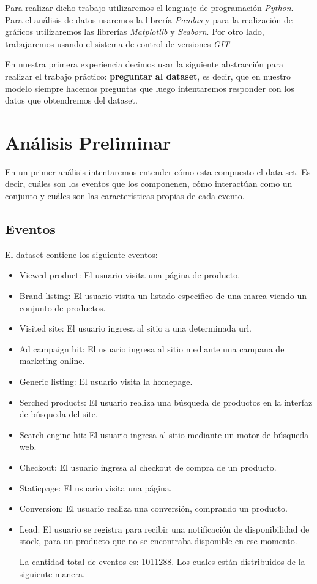 \documentclass[titlepage,a4paper]{article}
\begin{document}
	Para realizar dicho trabajo utilizaremos el lenguaje de programación \textit{Python}. Para el análisis de datos usaremos la librería \textit{Pandas} y para la realización de gráficos utilizaremos las librerías \textit{Matplotlib }y \textit{Seaborn}. Por otro lado, trabajaremos usando el sistema de control de versiones \textit{GIT}	
	
	En nuestra primera experiencia decimos usar la siguiente abstracción para realizar el trabajo práctico: \textbf{preguntar al dataset}, es decir, que en nuestro modelo siempre hacemos preguntas que luego intentaremos responder con los datos que obtendremos del dataset. 
	
	\section{Análisis Preliminar}
	En un primer análisis intentaremos entender cómo esta compuesto el data set. Es decir, cuáles son los eventos que los componenen, cómo interactúan como un conjunto y cuáles son las características propias de cada evento. 
	\subsection{Eventos}
	El dataset contiene los siguiente eventos: 
	\begin{itemize}
	\item Viewed product: El usuario visita una página de producto.
	\item Brand listing: El usuario visita un listado específico de una marca viendo un conjunto de productos.
	\item Visited site: El usuario ingresa al sitio a una determinada url.
	\item Ad campaign hit:  El usuario ingresa al sitio mediante una campana de marketing online.
	\item Generic listing:  El usuario visita la homepage.
	\item Serched products:  El usuario realiza una búsqueda de productos en la interfaz de búsqueda del site.
	\item Search engine hit: El usuario ingresa al sitio mediante un motor de búsqueda web.
	\item Checkout: El usuario ingresa al checkout de compra de un producto.
	\item Staticpage: El usuario visita una página.
	\item Conversion: El usuario realiza una conversión, comprando un producto.
	\item Lead: El usuario se registra para recibir una notificación de disponibilidad de stock, para un producto que no se encontraba disponible en ese momento.
	
	\newpage
	La cantidad total de eventos es: 	1011288. Los cuales están distribuidos de la siguiente manera. 
	\end{itemize}
	
\end{document}
